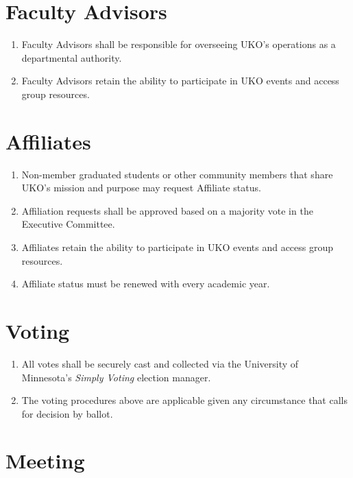 \documentclass[12pt,executivepaper]{article}
\begin{document}
\section{Faculty Advisors}

\begin{enumerate}
    \item Faculty Advisors shall be responsible for overseeing UKO's operations
          as a departmental authority.
    \item Faculty Advisors retain the ability to participate in UKO events and
          access group resources.
\end{enumerate}

\section{Affiliates}

\begin{enumerate}
    \item Non-member graduated students or other community members that
          share UKO's mission and purpose may request Affiliate status.
    \item Affiliation requests shall be approved based on a majority vote in
          the Executive Committee.
    \item Affiliates retain the ability to participate in UKO events and
          access group resources.
    \item Affiliate status must be renewed with every academic year.
\end{enumerate}

\section{Voting}

\begin{enumerate}
    \item All votes shall be securely cast and collected via the University of
          Minnesota's \textit{Simply Voting} election manager.
    \item The voting procedures above are applicable given any circumstance
	  that calls for decision by ballot.
\end{enumerate}

\section{Meeting}
\end{document}
